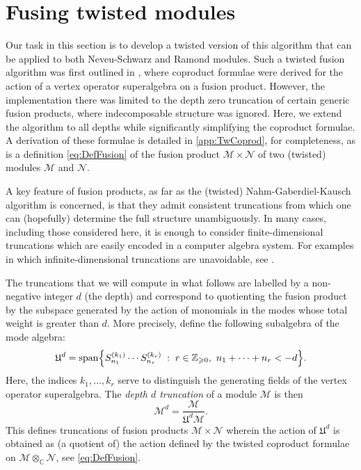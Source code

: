 \documentclass[a4paper,reqno,12pt]{report}
\theoremstyle{definition}
\numberwithin{equation}{section}
\let\originalleft\left     %
\let\originalright\right
\renewcommand{\left}{\mathopen{}\mathclose\bgroup\originalleft}
\renewcommand{\right}{\aftergroup\egroup\originalright}
\newcommand{\alg}[1]{\mathfrak{#1}} %
\newcommand{\set}[1]{\left\{ #1 \right\}}
\newcommand{\st}{\mspace{5mu} : \mspace{5mu}} %
\newcommand{\ZZ}{\mathbb{Z}}
\newcommand{\CC}{\mathbb{C}}
\newcommand{\fuse}{\mathbin{\times}}                                            %
\newcommand{\NGK}{Nahm-Gaberdiel-Kausch}
\newcommand{\ns}{Neveu-Schwarz}
\DeclareMathOperator{\vspn}{span}
\renewcommand{\ge}{\geqslant}
\theoremstyle{plain}
\newcommand{\Mod}[1]{\mathcal{#1}}                 %
\newcommand{\vosa}{vertex operator superalgebra}
\begin{document}
\section{Fusing twisted modules} \label{sec:TwFus}

Our task in this section is to develop a twisted version of this algorithm that can be applied to both \ns{} and Ramond modules.  Such a twisted fusion algorithm was first outlined in \cite{GabFus97}, where coproduct formulae were derived for the action of a \vosa{} on a fusion product.  However, the implementation there was limited to the depth zero truncation of certain generic fusion products, where indecomposable structure was ignored.  Here, we extend the algorithm to all depths while significantly simplifying the coproduct formulae.  A derivation of these formulae is detailed in \cref{app:TwCoprod}, for completeness, as is a definition \eqref{eq:DefFusion} of the fusion product $\Mod{M} \fuse \Mod{N}$ of two (twisted) modules $\Mod{M}$ and $\Mod{N}$.

A key feature of fusion products, as far as the (twisted) \NGK{} algorithm is concerned, is that they admit consistent truncations from which one can (hopefully) determine the full structure unambiguously.  In many cases, including those considered here, it is enough to consider finite-dimensional truncations which are easily encoded in a computer algebra system.  For examples in which infinite-dimensional truncations are unavoidable, see \cite{GabFus01,RidFus10,RidBos14}.  

The truncations that we will compute in what follows are labelled by a non-negative integer $d$ (the depth) and correspond to quotienting the fusion product by the subspace generated by the action of monomials in the modes whose total weight is greater than $d$.  More precisely, define the following subalgebra of the mode algebra:
\begin{equation}
\alg{U}^d = \vspn \set{S^{(k_1)}_{n_1} \cdots S^{(k_r)}_{n_r} \st r \in \ZZ_{\ge 0}, \ n_1 + \cdots + n_r < -d}.
\end{equation}
Here, the indices $k_1, \ldots, k_r$ serve to distinguish the generating fields of the \vosa{}.  The \emph{depth $d$ truncation} of a module $\Mod{M}$ is then
\begin{equation}
\Mod{M}^d = \frac{\Mod{M}}{\alg{U}^d \Mod{M}}.
\end{equation}
This defines truncations of fusion products $\Mod{M} \fuse \Mod{N}$ wherein the action of $\alg{U}^d$ is obtained as (a quotient of) the action defined by the twisted coproduct formulae on $\Mod{M} \otimes_{\CC} \Mod{N}$, see \eqref{eq:DefFusion}.
\end{document}
